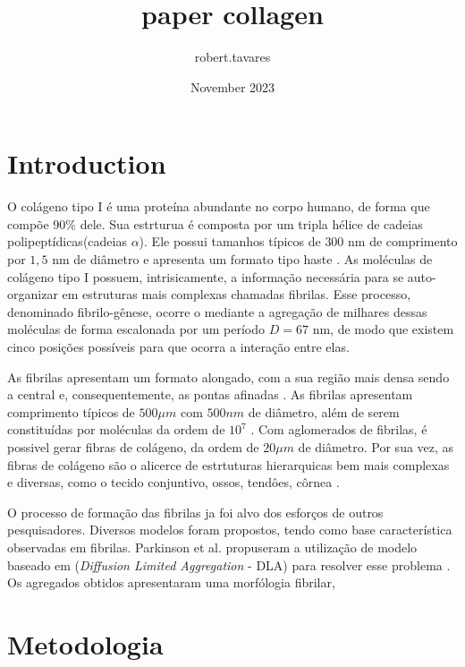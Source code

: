 \documentclass{article}
\title{paper collagen}
\author{robert.tavares}
\date{November 2023}
\begin{document}
\maketitle

\section{Introduction}

    O colágeno tipo I é uma proteína abundante no corpo humano, de forma que compõe $90\%$ dele. Sua estrturua é 
    composta por um tripla hélice de cadeias polipeptídicas(cadeias $\alpha$). Ele possui tamanhos típicos de $300$ nm de 
    comprimento por $1,5$ nm de diâmetro e apresenta um formato tipo haste \cite{Gelse2003,Silver2018}. As moléculas de 
    colágeno tipo I possuem, intrisicamente, a informação necessária para se auto-organizar em estruturas mais complexas 
    chamadas fibrilas. Esse processo, denominado fibrilo-gênese, ocorre o mediante a agregação de milhares dessas moléculas de forma 
    escalonada por um período $D= 67$ nm, de modo que existem cinco posições possíveis para que ocorra a interação entre 
    elas\cite{Zhu2018, KADLER1996}.  
    
    As fibrilas apresentam um formato alongado, com a sua região mais densa sendo a central e, consequentemente, as pontas 
    afinadas \cite{Charvolin2019, KADLER1996}. As fibrilas apresentam comprimento típicos de $500 \mu m$ com $500 nm$ de 
    diâmetro, além de serem constituídas por moléculas da ordem de $10^{7}$ \cite{Parry1984}. Com aglomerados de fibrilas, 
    é possivel gerar fibras de colágeno, da ordem de $20 \mu m$ de diâmetro. Por sua vez, as fibras de colágeno são 
    o alicerce de estrtuturas hierarquicas bem mais complexas e diversas, como o tecido conjuntivo, ossos, tendôes, côrnea 
    \cite{RicoLlanos2021, Silver2018}.

    O processo de formação das fibrilas ja foi alvo dos esforços de outros pesquisadores. Diversos modelos foram propostos, 
    tendo como base característica observadas em fibrilas. Parkinson et al. propuseram a utilização de modelo baseado em 
    (\textit{Diffusion Limited Aggregation} - DLA) para resolver esse problema \cite{Parkinson1995}. Os agregados obtidos
    apresentaram uma morfólogia fibrilar,  


\section{Metodologia}
\end{document}
